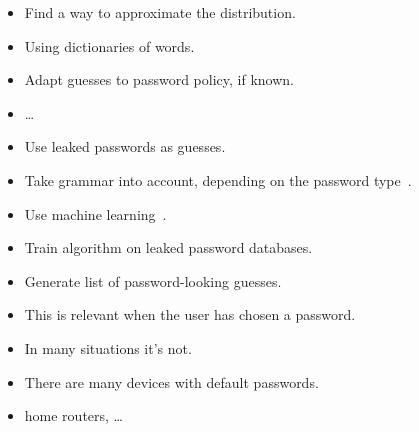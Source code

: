 \begin{frame}
  \begin{idea}
    \begin{itemize}
      \item Find a way to approximate the distribution.
    \end{itemize}
  \end{idea}

  \begin{example}
    \begin{itemize}
      \item Using dictionaries of words.
      \item Adapt guesses to password policy, if known.
      \item \dots
    \end{itemize}
  \end{example}
\end{frame}

\begin{frame}
  \begin{example}
    \begin{itemize}
      \item Use leaked passwords as guesses.
      \item Take grammar into account, depending on the password 
        type~\cite{Bonneau2012ghs,Bonneau2012lpo}.
    \end{itemize}
  \end{example}

  \pause

  \begin{example}
    \begin{itemize}
      \item Use machine learning~\cite{JohnTheRipper,OMEN,WeirPCFG}.
      \item Train algorithm on leaked password databases.
      \item Generate list of password-looking guesses.
    \end{itemize}
  \end{example}
\end{frame}

\begin{frame}
  \begin{remark}
    \begin{itemize}
      \item This is relevant when the user has chosen a password.
      \item In many situations it's not.
    \end{itemize}
  \end{remark}

  \pause{}

  \begin{example}
    \begin{itemize}
      \item There are many devices with default passwords.
      \item \Eg home routers, \dots
    \end{itemize}
  \end{example}
\end{frame}

